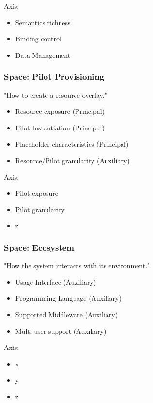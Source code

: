 \documentclass{sig-alternate}
\begin{document}
Axis:
\begin{itemize}
\item Semantics richness
\item Binding control
\item Data Management
\end{itemize}

\subsubsection{Space: Pilot Provisioning}
"How to create a resource overlay."
\begin{itemize}
\item Resource exposure (Principal)
\item Pilot Instantiation (Principal)
\item Placeholder characteristics (Principal)
\item Resource/Pilot granularity (Auxiliary)
\end{itemize}

Axis:
\begin{itemize}
\item Pilot exposure
\item Pilot granularity
\item z
\end{itemize}

\subsubsection{Space: Ecosystem}
"How the system interacts with its environment."
\begin{itemize}
\item Usage Interface (Auxiliary)
\item Programming Language (Auxiliary)
\item Supported Middleware (Auxiliary)
\item Multi-user support (Auxiliary)
\end{itemize}

Axis:
\begin{itemize}
\item x
\item y
\item z
\end{itemize}
\end{document}
